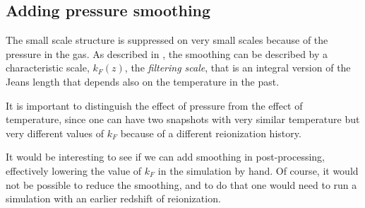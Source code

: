 \subsection{Adding pressure smoothing}

The small scale structure is suppressed on very small scales because of the
pressure in the gas.
As described in \cite{Hui1997,Gnedin1998}, the smoothing can be described
by a characteristic scale, $k_F(z)$, the \textit{filtering scale}, that is
an integral version of the Jeans length that depends also on the temperature
in the past.

It is important to distinguish the effect of pressure from the effect of
temperature, since one can have two snapshots with very similar temperature
but very different values of $k_F$ because of a different reionization
history.


It would be interesting to see if we can add smoothing in post-processing,
effectively lowering the value of $k_F$ in the simulation by hand.
Of course, it would not be possible to reduce the smoothing, and to do that
one would need to run a simulation with an earlier redshift of reionization.

